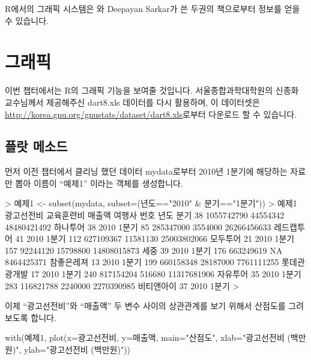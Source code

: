 R에서의 그래픽 시스템은 \citet{Murrell2005}와 Deepayan Sarkar가 쓴 두권의 책으로부터 정보를 얻을 수 있습니다.


\chapter{그래픽}

이번 챕터에서는 R의 그래픽 기능을 보여줄 것입니다.
서울종합과학대학원의 신종화 교수님께서 제공해주신 dart8.xls 데이터를 다시 활용하며, 이 데이터셋은 \href{http://korea.gnu.org/gnustats/dataset/dart8.xls}{http://korea.gnu.org/gnustats/dataset/dart8.xls}로부터 다운로드 할 수 있습니다.

\section{플랏 메소드}
먼저 이전 챕터에서 클리닝 했던 데이터 mydata로부터 2010년 1분기에 해당하는 자료만 뽑아 이름이 ``예제1'' 이라는 객체를 생성합니다.

\begin{Schunk}
\begin{Soutput}	
> 예제1 <- subset(mydata, subset=(년도=="2010" & 분기=="1분기"))
> 예제1 
    광고선전비 교육훈련비      매출액       여행사 번호 년도  분기
38  1055742790   44554342 48480421492     하나투어   38 2010 1분기
85   285347000    3554000 26266456633   레드캡투어   41 2010 1분기
112  627109367   11581130 25003802066     모두투어   21 2010 1분기
157   92244120   15798800 14808015873         세중   39 2010 1분기
176  663249619         NA  8464425371   참좋은레져   13 2010 1분기
199  660158348   28187000  7761111255 롯데관광개발   17 2010 1분기
240  817154204     516680 11317681906     자유투어   35 2010 1분기
283  116821788    2240000  2270390985   비티앤아이   37 2010 1분기
>
\end{Soutput}
\end{Schunk}

이제 ``광고선전비''와 ``매출액'' 두 변수 사이의 상관관계를 보기 위해서 산점도를 그려보도록 합니다.

\begin{Schunk}
\begin{Soutput}	
with(예제1, plot(x=광고선전비, y=매출액, main="산점도", xlab="광고선전비 (백만원)", ylab="광고선전비 (백만원)"))
\end{Soutput}
\end{Schunk}

